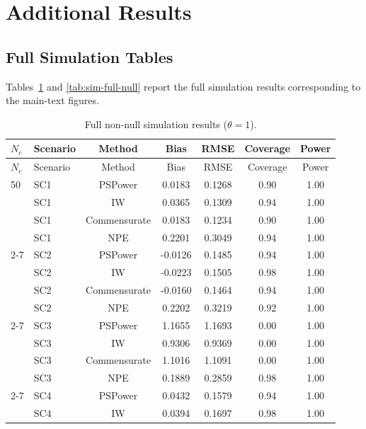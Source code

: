 \section{Additional Results}
\label{app:additional-results}

\subsection{Full Simulation Tables}

Tables~\ref{tab:sim-full-nonnull} and \ref{tab:sim-full-null} report the full
simulation results corresponding to the main-text figures.

\scriptsize
\setlength{\tabcolsep}{3pt}
\renewcommand{\arraystretch}{1.08}
\begin{longtable}{llccccc}
\caption{Full non-null simulation results ($\theta = 1$).}
\label{tab:sim-full-nonnull}\\
\toprule
$N_c$ & Scenario & Method & Bias & RMSE & Coverage & Power \\
\midrule
\endfirsthead
\toprule
$N_c$ & Scenario & Method & Bias & RMSE & Coverage & Power \\
\midrule
\endhead
50 & SC1 & PSPower      & 0.0183 & 0.1268 & 0.90 & 1.00 \\
& SC1 & IW           & 0.0365 & 0.1309 & 0.94 & 1.00 \\
& SC1 & Commensurate & 0.0183 & 0.1234 & 0.90 & 1.00 \\
& SC1 & NPE          & 0.2201 & 0.3049 & 0.94 & 1.00 \\
\cmidrule(lr){2-7}
& SC2 & PSPower      & -0.0126 & 0.1485 & 0.94 & 1.00 \\
& SC2 & IW           & -0.0223 & 0.1505 & 0.98 & 1.00 \\
& SC2 & Commensurate & -0.0160 & 0.1464 & 0.94 & 1.00 \\
& SC2 & NPE          & 0.2202 & 0.3219 & 0.92 & 1.00 \\
\cmidrule(lr){2-7}
& SC3 & PSPower      & 1.1655 & 1.1693 & 0.00 & 1.00 \\
& SC3 & IW           & 0.9306 & 0.9369 & 0.00 & 1.00 \\
& SC3 & Commensurate & 1.1016 & 1.1091 & 0.00 & 1.00 \\
& SC3 & NPE          & 0.1889 & 0.2859 & 0.98 & 1.00 \\
\cmidrule(lr){2-7}
& SC4 & PSPower      & 0.0432 & 0.1579 & 0.94 & 1.00 \\
& SC4 & IW           & 0.0394 & 0.1697 & 0.98 & 1.00 \\

\end{longtable}
